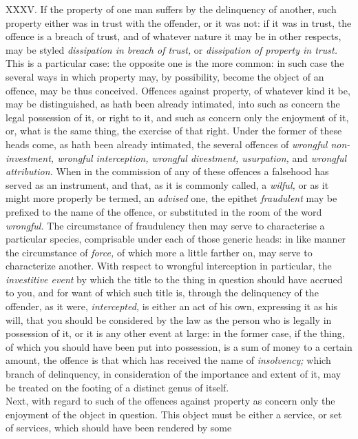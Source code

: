 \documentclass[12pt]{report}
\begin{document}
XXXV. If the property of one man suffers by the delinquency of another,
such property either was in trust with the offender, or it was not: if
it was in trust, the offence is a breach of trust, and of whatever
nature it may be in other respects, may be styled \emph{dissipation in
breach of trust,} or \emph{dissipation of property in trust.} This is a
particular case: the opposite one is the more common: in such case the
several ways in which property may, by possibility, become the object of
an offence, may be thus conceived. Offences against property, of
whatever kind it be, may be distinguished, as hath been already
intimated, into such as concern the legal possession of it, or right to
it, and such as concern only the enjoyment of it, or, what is the same
thing, the exercise of that right. Under the former of these heads come,
as hath been already intimated, the several offences of \emph{wrongful
non-investment, wrongful interception, wrongful divestment, usurpation,}
and \emph{wrongful attribution.} When in the commission of any of these
offences a falsehood has served as an instrument, and that, as it is
commonly called, a \emph{wilful,} or as it might more properly be
termed, an \emph{advised} one, the epithet \emph{fraudulent} may be
prefixed to the name of the offence, or substituted in the room of the
word \emph{wrongful.} The circumstance of fraudulency then may serve to
characterise a particular species, comprisable under each of those
generic heads: in like manner the circumstance of \emph{force,} of which
more a little farther on, may serve to characterize another. With
respect to wrongful interception in particular, the \emph{investitive
event} by which the title to the thing in question should have accrued
to you, and for want of which such title is, through the delinquency of
the offender, as it were, \emph{intercepted,} is either an act of his
own, expressing it as his will, that you should be considered by the law
as the person who is legally in possession of it, or it is any other
event at large: in the former case, if the thing, of which you should
have been put into possession, is a sum of money to a certain amount,
the offence is that which has received the name of \emph{insolvency;}
which branch of delinquency, in consideration of the importance and
extent of it, may be treated on the footing of a distinct genus of
itself.\\
Next, with regard to such of the offences against property as concern
only the enjoyment of the object in question. This object must be either
a service, or set of services, which should have been rendered by some
\end{document}
